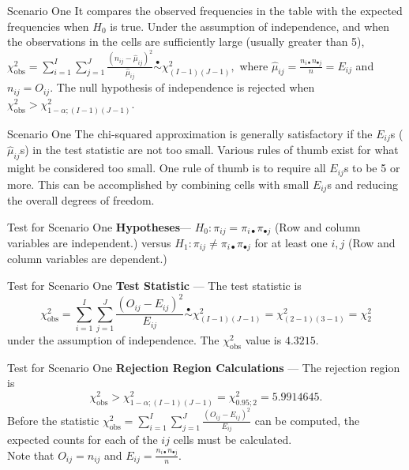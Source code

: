 \documentclass[
  ignorenonframetext,
]{beamer}
\begin{document}
\begin{frame}{Scenario One}
\label{scenario-one-5}
It compares the observed frequencies in the table with the expected
frequencies when \(H_0\) is true. Under the assumption of independence,
and when the observations in the cells are sufficiently large (usually
greater than 5),
\(\chi_{\text{obs}}^2 =\sum_{i=1}^{I}\sum_{j=1}^J \frac{(n_{ij}-\hat{\mu}_{ij})^2}{\hat{\mu}_{ij}} \overset{\bullet}{\sim} \chi^2_{(I-1)(J-1)},\)
where \(\hat{\mu}_{ij}=\frac{n_{i\bullet}n_{\bullet j}}{n} = E_{ij}\)
and \(n_{ij} = O_{ij}\). The null hypothesis of independence is rejected
when \(\chi_{\text{obs}}^2 > \chi^2_{1-\alpha; (I-1)(J-1)}\).
\end{frame}

\begin{frame}{Scenario One}
\label{scenario-one-6}
The chi-squared approximation is generally satisfactory if the
\(E_{ij}\)s (\(\hat{\mu}_{ij}\)s) in the test statistic are not too
small. Various rules of thumb exist for what might be considered too
small. One rule of thumb is to require all \(E_{ij}\)s to be 5 or more.
This can be accomplished by combining cells with small \(E_{ij}\)s and
reducing the overall degrees of freedom.
\end{frame}

\begin{frame}{Test for Scenario One}
\label{test-for-scenario-one}
\textbf{Hypotheses}--- \(H_0: \pi_{ij} = \pi_{i\bullet}\pi_{\bullet j}\)
(Row and column variables are independent.) versus
\(H_1: \pi_{ij} \ne \pi_{i\bullet}\pi_{\bullet j}\) for at least one
\(i, j\) (Row and column variables are dependent.)
\end{frame}

\begin{frame}{Test for Scenario One}
\label{test-for-scenario-one-1}
\textbf{Test Statistic} --- The test statistic is
\[\chi_{\text{obs}}^2=\sum_{i=1}^I \sum_{j=1}^J \frac{(O_{ij}-E_{ij})^2}{E_{ij}} \overset{\bullet}{\sim} \chi^2_{(I-1)(J-1)}=\chi^2_{(2-1)(3-1)}=\chi^2_2\]
under the assumption of independence. The \(\chi^2_{\text{obs}}\) value
is \(4.3215\).
\end{frame}

\begin{frame}{Test for Scenario One}
\label{test-for-scenario-one-2}
\textbf{Rejection Region Calculations} --- The rejection region is
\[\chi_{\text{obs}}^2 > \chi^2_{1-\alpha; (I-1)(J-1)}=\chi^2_{0.95;2}=
        5.9914645.\] Before the statistic
\(\chi^2_{\text{obs}}= \sum_{i=1}^I\sum_{j=1}^J
        \frac{(O_{ij} - E_{ij})^2}{E_{ij}}\) can be computed, the
expected counts for each of the \(ij\) cells must be calculated.\\
Note that \(O_{ij}=n_{ij}\) and
\(E_{ij}=\frac{n_{i\bullet}n_{\bullet j}}{n}\).
\end{frame}
\end{document}
